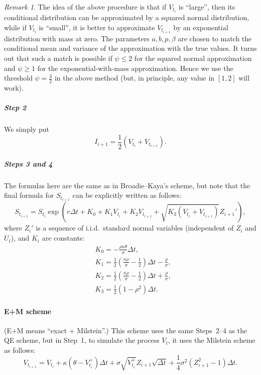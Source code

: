 \documentclass[a4paper,11pt,titlepage]{article}
\theoremstyle{remark}
\newtheorem{remark}{Remark}
\begin{document}
\begin{remark}
The idea of the above procedure is that if $V_{t_i}$ is ``large'', then its
conditional distribution can be approximated by a squared normal distribution,
while if $V_{t_i}$ is ``small'', it is better to approximate $V_{t_{i+1}}$ by
an exponential distribution with mass at zero. The parameters $a,b,p,\beta$ are
chosen to match the conditional mean and variance of the approximation with the
true values. It turns out that such a match is possible if $\psi\le 2$ for the
squared normal approximation and $\psi\ge 1$ for the exponential-with-mass
approximation. Hence we use the threshold $\psi=\frac32$ in the above method
(but, in principle, any value in $[1,2]$ will work).
\end{remark}

\subparagraph{Step 2} We simply put
\[
I_{i+1} = \frac12 (V_{t_i} + V_{t_{i+1}}).
\]

\subparagraph{Steps 3 and 4} The formulas here are the same as in
Broadie--Kaya's scheme, but note that the final formula for $S_{t_{i+1}}$ can
be explicitly written as follows:
\[
S_{t_{i+1}} = S_{t_i} 
\exp\left( 
  r\Delta t + K_0 + K_1 V_{t_i} + K_2 V_{t_{i+1}} + \sqrt{K_3 (V_{t_i} 
  + V_{t_{i+1}})} Z_{i+1}' 
\right),
\]
where $Z_i'$ is a sequence of i.i.d.\ standard normal variables (independent of
$Z_i$ and $U_i$), and $K_i$ are constants:
\begin{align*}
&K_0 = -\frac{\rho\kappa\theta}{\sigma}\Delta t,\\
&K_1 = \frac12 \left( \frac{\kappa\rho}{\sigma}-\frac12 \right) \Delta t 
     - \frac{\rho}{\sigma},\\
&K_2 = \frac12 \left(\frac{\kappa\rho}{\sigma}-\frac12\right)\Delta t 
     + \frac{\rho}{\sigma},\\
&K_3 = \frac12 (1-\rho^2)\Delta t.
\end{align*}

\paragraph{E+M scheme \citep{MrazekPospisil17}} 
(E+M means ``exact + Milstein''.) This scheme uses the same Steps~2--4 as the
QE scheme, but in Step~1, to simulate the process $V_t$, it uses the Milstein
scheme as follows:
\[
V_{t_{i+1}} = V_{t_i} + \kappa(\theta- V_{t_i}^+) \Delta t 
+ \sigma \sqrt{V_{t_i}^+} Z_{i+1} \sqrt{\Delta t} 
+ \frac14 \sigma^2(Z_{i+1}^2 -1) \Delta t. 
\]
\end{document}
